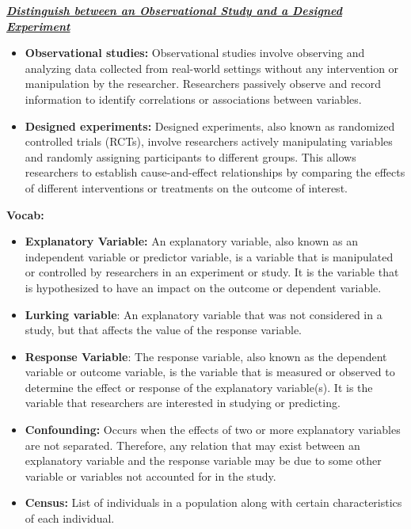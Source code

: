 \documentclass{report}
\begin{document}
        \bigbreak \noindent 
        \textbf{\textit{\underline{Distinguish between an Observational Study and a Designed Experiment}}}
        \begin{itemize}
            \item \textbf{Observational studies:} Observational studies involve observing and analyzing data collected from real-world settings without any intervention or manipulation by the researcher. Researchers passively observe and record information to identify correlations or associations between variables.
            \item \textbf{Designed experiments:} Designed experiments, also known as randomized controlled trials (RCTs), involve researchers actively manipulating variables and randomly assigning participants to different groups. This allows researchers to establish cause-and-effect relationships by comparing the effects of different interventions or treatments on the outcome of interest.
        \end{itemize}
        \bigbreak \noindent 
        \textbf{Vocab:}
        \begin{itemize}
            \item \textbf{Explanatory Variable:} An explanatory variable, also known as an independent variable or predictor variable, is a variable that is manipulated or controlled by researchers in an experiment or study. It is the variable that is hypothesized to have an impact on the outcome or dependent variable. 
            \item \textbf{Lurking variable}: An explanatory variable that was not considered in a study, but that affects the value of the response variable.
            \item \textbf{Response Variable}: The response variable, also known as the dependent variable or outcome variable, is the variable that is measured or observed to determine the effect or response of the explanatory variable(s). It is the variable that researchers are interested in studying or predicting. 
            \item \textbf{Confounding:} Occurs when the effects of two or more explanatory variables are not separated. Therefore, any relation that may exist between an explanatory variable and the response variable may be due to some other variable or variables not accounted for in the study.
            \item \textbf{Census:} List of individuals in a population along with certain characteristics of each individual.
        \end{itemize}
\end{document}
